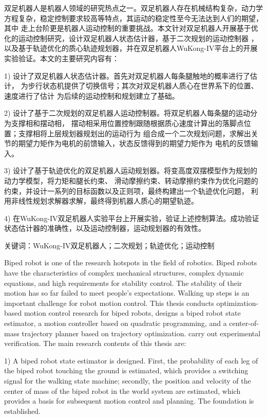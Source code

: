 \cleardoublepage
{}

双足机器人是机器人领域的研究热点之一。双足机器人存在机械结构复杂，动力学
方程复杂，稳定控制要求较高等特点，其运动的稳定性至今无法达到人们的期望，其中
走上台阶更是机器人运动控制的重要挑战。本文针对双足机器人开展基于优化的运动控制研究，设计双足机器人状态估计器，基于二次规划的运动控制器
，以及基于轨迹优化的质心轨迹规划器，并在双足机器人WuKong-IV平台上的开展实验验证。本文的主要研究内容有：

1) 设计了双足机器人状态估计器。首先对双足机器人每条腿触地的概率进行了估计，
为步行状态机提供了切换信号；其次对双足机器人质心在世界系下的位置、速度进行了估计
为后续的运动控制和规划建立了基础。

2) 设计了基于二次规划的双足机器人运动控制器。将双足机器人每条腿的运动分为支撑相和摆动相，
摆动相采用位置控制跟随根据质心速度计算出的落脚点位置；支撑相将上层规划器规划出的运动行为
组合成一个二次规划问题，求解出关节的期望力矩作为电机的前馈输入，状态反馈得到的期望力矩作为
电机的反馈输入。

3) 设计了基于轨迹优化的双足机器人运动规划器。将变高度双摆模型作为规划的动力学模型，将力矩和腿长约束、
滑动摩擦约束、转动摩擦约束作为优化问题的约束，并设计一系列的目标函数以及正则项，最终构建出一个轨迹优化问题，
利用非线性规划求解器求解，最终得到机器人质心的期望轨迹。

4) 在WuKong-IV双足机器人实验平台上开展实验，验证上述控制算法。成功验证
状态估计器的准确性，以及运动控制器，运动规划器的有效性。

关键词：WuKong-IV双足机器人；二次规划；轨迹优化；运动控制

\cleardoublepage
{}

Biped robot is one of the research hotspots in the field of robotics. Biped robots have the characteristics of complex mechanical structures, 
complex dynamic equations, and high requirements for stability control. The stability of their motion has so far failed to meet people's expectations. 
Walking up steps is an important challenge for robot motion control. This thesis conducts optimization-based motion control research for biped robots, 
designs a biped robot state estimator, a motion controller based on quadratic programming, and a center-of-mass trajectory planner based on trajectory optimization. 
carry out experimental verification. The main research contents of this thesis are:

1) A biped robot state estimator is designed. First, the probability of each leg of the biped robot touching the ground is estimated, 
which provides a switching signal for the walking state machine; secondly, the position and velocity of the center of mass of the biped robot in the world system are estimated, 
which provides a basis for subsequent motion control and planning. The foundation is established.

